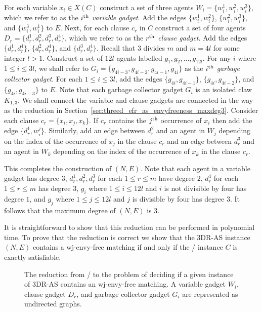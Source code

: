 For each variable $x_i \in X(C)$ construct a set of three agents $W_i = \{ w_i^1, w_i^2, w_i^3 \}$, which we refer to as the \emph{$i\textsuperscript{th}$ variable gadget}. Add the edges $\{ w_i^1, w_i^2 \}$, $\{ w_i^2, w_i^3 \}$, and $\{ w_i^3, w_i^1 \}$ to $E$. Next, for each clause $c_r$ in $C$ construct a set of four agents $D_r = \{ d_r^1, d_r^2, d_r^3, d_r^4 \}$,  which we refer to as the \emph{$r\textsuperscript{th}$ clause gadget}. Add the edges $\{ d_r^1, d_r^4 \}$, $\{ d_r^2, d_r^4 \}$, and $\{ d_r^3, d_r^4 \}$. Recall that $3$ divides $m$ and $m=4l$ for some integer $l>1$. Construct a set of $12l$ agents labelled $g_1, g_2, \dots, g_{12l}$. For any $i$ where $1\leq i\leq 3l$, we shall refer to $G_i = \{ g_{4i-3}, g_{4i-2}, g_{4i-1}, g_{4i} \}$ as the \emph{$i\textsuperscript{th}$ garbage collector gadget}. For each $1\leq i\leq 3l$, add the edges $\{ g_{4i}, g_{4i-1} \}$, $\{ g_{4i}, g_{4i-2} \}$, and $\{ g_{4i}, g_{4i-3} \}$ to $E$. Note that each garbage collector gadget $G_i$ is an isolated claw $K_{1,3}$. 
We shall connect the variable and clause gadgets are connected in the way as the reduction in Section~\ref{sec:threed_efr_as_envyfreeness_maxdeg3}. Consider each clause $c_r = \{ x_i, x_j, x_k \}$. If $c_r$ contains the $j\textsuperscript{th}$ occurrence of $x_i$ then add the edge $\{ d_r^1, w_i^j \}$. Similarly, add an edge between $d_r^2$ and an agent in $W_j$ depending on the index of the occurrence of $x_j$ in the clause $c_r$ and an edge between $d_r^3$ and an agent in $W_k$ depending on the index of the occurrence of $x_k$ in the clause $c_r$.

This completes the construction of $(N, E)$. Note that each agent in a variable gadget has degree $3$, $d_r^1, d_r^2, d_r^3$ for each $1 \leq r \leq m$ have degree $2$, $d_r^4$ for each $1 \leq r \leq m$ has degree $3$, $g_i$ where $1\leq i\leq 12l$ and $i$ is not divisible by four has degree $1$, and $g_j$ where $1\leq j\leq 12l$ and $j$ is divisible by four has degree $3$. It follows that the maximum degree of $(N, E)$ is $3$.

It is straightforward to show that this reduction can be performed in polynomial time. To prove that the reduction is correct we show that the 3DR-AS instance $(N, E)$ contains a wj-envy-free matching if and only if the \porschenxsatvariant/ instance $C$ is exactly satisfiable.

\begin{figure}
    \centering
    
    \caption[The reduction from \porschenxsatvariant/ to the problem of deciding if a given instance of 3DR-AS contains an wj-envy-free matching]{The reduction from \porschenxsatvariant/ to the problem of deciding if a given instance of 3DR-AS contains an wj-envy-free matching. A variable gadget $W_i$, clause gadget $D_r$, and garbage collector gadget $G_i$ are represented as undirected graphs.}
    \label{fig:threed_efr_as_wj_envy_free_reduction}
\end{figure}

